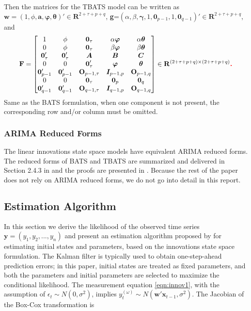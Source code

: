 \documentclass{uwstat572}
\newcommand{\vmadd}[1]{\textbf{\color{red}{#1}}}
\begin{document}
Then the matrices for the TBATS model can be written as $\textbf{w}=(1,\phi,\textbf{a}, \bm{\varphi}, \bm{\theta})' \in \mathbf{R}^{2+\tau+p+q}$, \textbf{g}=$(\alpha,\beta,\bm{\gamma}, 1, \textbf{0}_{p-1}, 1, \textbf{0}_{q-1})'\in \mathbf{R}^{2+\tau+p+q}$, and 
\[
\textbf{F}=\begin{bmatrix} 
1 & \phi& \textbf{0}_\tau & \alpha \bm{\varphi} & \alpha \bm{\theta}  \\
0 & \phi& \textbf{0}_\tau & \beta \bm{\varphi} & \beta \bm{\theta}  \\
\textbf{0}'_\tau &  \textbf{0}'_\tau  & \bm{A} & \bm{B} & \bm{C} \\
0 & 0 & \textbf{0}'_\tau & \bm{\varphi} & \bm{\theta}  \\
\bm{0}'_{p-1} & \bm{0}'_{p-1} & \textbf{O}_{p-1,\tau} & \bm{I}_{p-1,p} &\textbf{O}_{p-1,q} \\
0 & 0 &\textbf{0}_\tau & \textbf{0}_p & \textbf{0}_q \\
\bm{0}'_{q-1} & \bm{0}'_{q-1} & \textbf{O}_{q-1,\tau} & \bm{I}_{q-1,p} &\textbf{O}_{q-1,q} \\
\end{bmatrix} \in \mathbf{R}^{(2+\tau+p+q) \times (2+\tau+p+q)}\vmadd{.}
\]
Same as the BATS formulation, when one component is not present, the corresponding row and/or column must be omitted.

\subsubsection{ARIMA Reduced Forms}
The linear innovations state space models have equivalent ARIMA reduced forms. The reduced forms of BATS and TBATS are summarized and delivered in Section 2.4.3 in \citet{de2011forecasting} and the proofs are presented in \citet{dethesis}. Because the rest of the paper does not rely on ARIMA reduced forms, we do not go into detail in this report. 

\subsection{Estimation Algorithm}
In this section we derive the likelihood of the observed time series $\textbf{y}=(y_1,y_2,...,y_n)$ and present an estimation algorithm proposed by \citet{de2011forecasting} for estimating initial states and parameters, based on the innovations state space formulation. The Kalman filter is typically used to obtain one-step-ahead prediction errors; in this paper, initial states are treated as fixed parameters, and both the parameters and initial parameters are selected to maximize the conditional likelihood. The measurement equation \ref{eqn:innov1}, with the assumption of $\epsilon_t \sim N(0,\sigma^2)$, implies $y_t^{(\omega)} \sim N(\textbf{w}'\textbf{x}_{t-1},\sigma^2)$. The Jacobian of the Box-Cox transformation is
\end{document}
